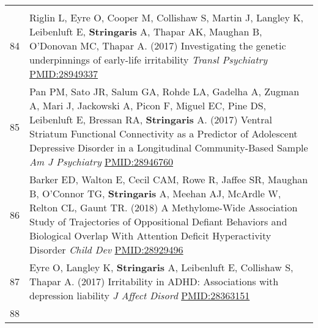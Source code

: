 \documentclass[
]{article}
\begin{document}
\begin{longtable}[]{@{}ll@{}}
\begin{minipage}[t]{0.94\columnwidth}
\end{minipage}\tabularnewline
\begin{minipage}[t]{0.01\columnwidth}\raggedright
84\strut
\end{minipage} & \begin{minipage}[t]{0.94\columnwidth}\raggedright
Riglin L, Eyre O, Cooper M, Collishaw S, Martin J, Langley K, Leibenluft
E, \textbf{Stringaris} A, Thapar AK, Maughan B, O'Donovan MC, Thapar A.
(2017) Investigating the genetic underpinnings of early-life
irritability \emph{Transl Psychiatry} \url{PMID:28949337}\strut
\end{minipage}\tabularnewline
\begin{minipage}[t]{0.01\columnwidth}\raggedright
85\strut
\end{minipage} & \begin{minipage}[t]{0.94\columnwidth}\raggedright
Pan PM, Sato JR, Salum GA, Rohde LA, Gadelha A, Zugman A, Mari J,
Jackowski A, Picon F, Miguel EC, Pine DS, Leibenluft E, Bressan RA,
\textbf{Stringaris} A. (2017) Ventral Striatum Functional Connectivity
as a Predictor of Adolescent Depressive Disorder in a Longitudinal
Community-Based Sample \emph{Am J Psychiatry} \url{PMID:28946760}\strut
\end{minipage}\tabularnewline
\begin{minipage}[t]{0.01\columnwidth}\raggedright
86\strut
\end{minipage} & \begin{minipage}[t]{0.94\columnwidth}\raggedright
Barker ED, Walton E, Cecil CAM, Rowe R, Jaffee SR, Maughan B, O'Connor
TG, \textbf{Stringaris} A, Meehan AJ, McArdle W, Relton CL, Gaunt TR.
(2018) A Methylome-Wide Association Study of Trajectories of
Oppositional Defiant Behaviors and Biological Overlap With Attention
Deficit Hyperactivity Disorder \emph{Child Dev}
\url{PMID:28929496}\strut
\end{minipage}\tabularnewline
\begin{minipage}[t]{0.01\columnwidth}\raggedright
87\strut
\end{minipage} & \begin{minipage}[t]{0.94\columnwidth}\raggedright
Eyre O, Langley K, \textbf{Stringaris} A, Leibenluft E, Collishaw S,
Thapar A. (2017) Irritability in ADHD: Associations with depression
liability \emph{J Affect Disord} \url{PMID:28363151}\strut
\end{minipage}\tabularnewline
\begin{minipage}[t]{0.01\columnwidth}\raggedright
88\strut
\end{minipage} & \begin{minipage}[t]{0.94\columnwidth}\raggedright

\end{minipage}
\end{longtable}
\end{document}
